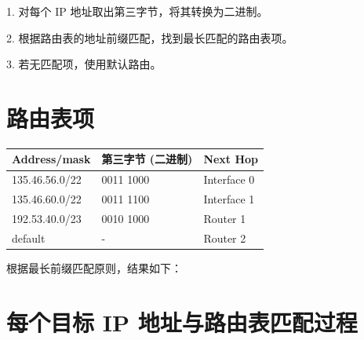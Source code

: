 1. 对每个 IP 地址取出第三字节，将其转换为二进制。

2. 根据路由表的地址前缀匹配，找到最长匹配的路由表项。

3. 若无匹配项，使用默认路由。

\section*{路由表项}

\begin{center}
\begin{tabular}{|l|l|l|}
\hline
\textbf{Address/mask} & \textbf{第三字节 (二进制)} & \textbf{Next Hop} \\ \hline
135.46.56.0/22 & 0011 1000 & Interface 0 \\ \hline
135.46.60.0/22 & 0011 1100 & Interface 1 \\ \hline
192.53.40.0/23 & 0010 1000 & Router 1 \\ \hline
default & - & Router 2 \\ \hline
\end{tabular}
\end{center}

根据最长前缀匹配原则，结果如下：

\section*{每个目标 IP 地址与路由表匹配过程}

